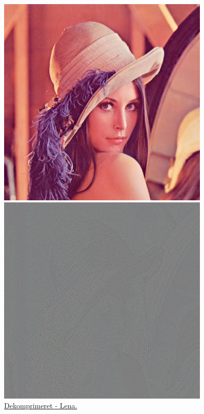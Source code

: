 \begin{figure}[htbp]
\begin{minipage}{0.3\textwidth}
\centering
\includegraphics[width=0.9\textwidth]{Billeder/LenaAnvendelse/LENABILLEDE/lena5-compressed.png}
\caption{\href{https://www.dropbox.com/home/P1\%20-\%20B205/vejleder/billeder/DCT/Lena\%20ved\%20forskelige\%20Q?preview=lenaQ50.png}{Dekomprimeret - Lena.}}
\label{fig:lena5-decompressed-visuel}
\end{minipage}
\hspace{0.5cm}
\begin{minipage}{0.3\textwidth}
\centering
\includegraphics[width=0.9\textwidth]{Billeder/fejlbilleder/fejl50.png}

\end{minipage}
\end{figure}
